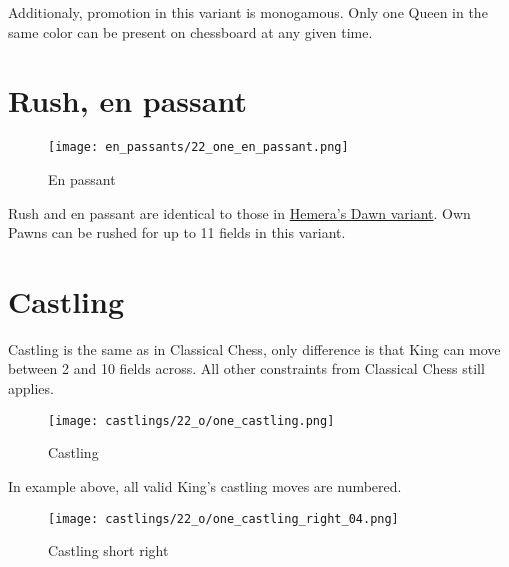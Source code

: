 Additionaly, promotion in this variant is monogamous.
Only one Queen in the same color can be present on chessboard at any given time.

\clearpage %

\section*{Rush, en passant}

\vspace*{-1.2\baselineskip}
\noindent
\begin{figure}[!h]
\texttt{[image: en\_passants/22\_one\_en\_passant.png]}
\caption{En passant}
\label{fig:22_one_en_passant}
\end{figure}

Rush and en passant are identical to those in \hyperref[fig:14_hemera_s_dawn_en_passant]{Hemera's Dawn variant}.
Own Pawns can be rushed for up to 11 fields in this variant.

\clearpage %

\section*{Castling}

Castling is the same as in Classical Chess, only difference is that King can move between 2 and 10 fields across.
All other constraints from Classical Chess still applies.

\noindent
\begin{figure}[!h]
\texttt{[image: castlings/22\_o/one\_castling.png]}
\caption{Castling}
\label{fig:one_castling}
\end{figure}

In example above, all valid King's castling moves are numbered.

\noindent
\begin{figure}[!h]
\texttt{[image: castlings/22\_o/one\_castling\_right\_04.png]}
\caption{Castling short right}
\label{fig:one_castling_right_04}
\end{figure}

